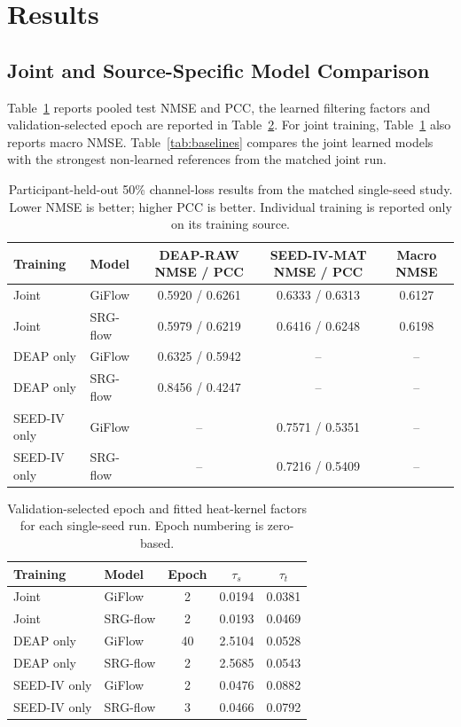 \documentclass{article}
\begin{document}
\section{Results}

\subsection{Joint and Source-Specific Model Comparison}

Table~\ref{tab:models} reports pooled test NMSE and PCC, the learned
filtering factors and validation-selected epoch are reported in
Table~\ref{tab:filtering}. For joint training, Table~\ref{tab:models} also
reports macro NMSE. Table~\ref{tab:baselines}
compares the joint learned models with the strongest non-learned references
from the matched joint run.

\begin{table}[t]
\centering
\caption{Participant-held-out 50\% channel-loss results from the matched
single-seed study. Lower NMSE is better; higher PCC is better. Individual
training is reported only on its training source.}
\label{tab:models}
\small
\begin{tabular}{llccc}
\toprule
Training & Model & DEAP-RAW NMSE / PCC & SEED-IV-MAT NMSE / PCC & Macro NMSE\\
\midrule
Joint & GiFlow    & 0.5920 / 0.6261 & 0.6333 / 0.6313 & 0.6127\\
Joint & SRG-flow  & 0.5979 / 0.6219 & 0.6416 / 0.6248 & 0.6198\\
\midrule
DEAP only & GiFlow   & 0.6325 / 0.5942 & -- & --\\
DEAP only & SRG-flow & 0.8456 / 0.4247 & -- & --\\
SEED-IV only & GiFlow   & -- & 0.7571 / 0.5351 & --\\
SEED-IV only & SRG-flow & -- & 0.7216 / 0.5409 & --\\
\bottomrule
\end{tabular}
\end{table}

\begin{table}[t]
\centering
\caption{Validation-selected epoch and fitted heat-kernel factors for each
single-seed run. Epoch numbering is zero-based.}
\label{tab:filtering}
\small
\begin{tabular}{llccc}
\toprule
Training & Model & Epoch & $\tau_s$ & $\tau_t$\\
\midrule
Joint & GiFlow & 2 & 0.0194 & 0.0381\\
Joint & SRG-flow & 2 & 0.0193 & 0.0469\\
DEAP only & GiFlow & 40 & 2.5104 & 0.0528\\
DEAP only & SRG-flow & 2 & 2.5685 & 0.0543\\
SEED-IV only & GiFlow & 2 & 0.0476 & 0.0882\\
SEED-IV only & SRG-flow & 3 & 0.0466 & 0.0792\\
\bottomrule
\end{tabular}
\end{table}
\end{document}
